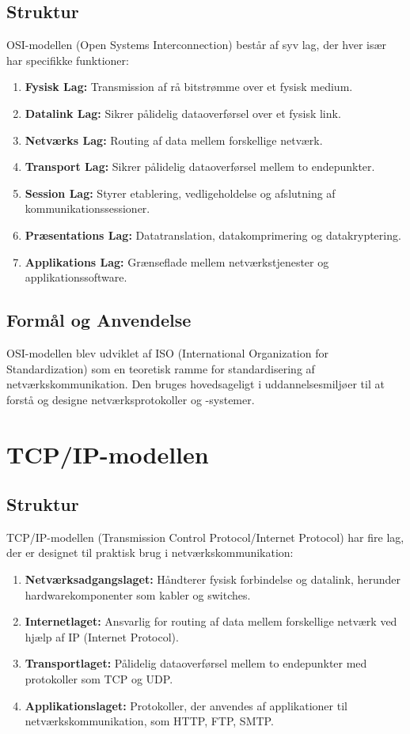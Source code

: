 \subsection{Struktur}
OSI-modellen (Open Systems Interconnection) består af syv lag, der hver især har specifikke funktioner:
\begin{enumerate}
	\item \textbf{Fysisk Lag:} Transmission af rå bitstrømme over et fysisk medium.
	\item \textbf{Datalink Lag:} Sikrer pålidelig dataoverførsel over et fysisk link.
	\item \textbf{Netværks Lag:} Routing af data mellem forskellige netværk.
	\item \textbf{Transport Lag:} Sikrer pålidelig dataoverførsel mellem to endepunkter.
	\item \textbf{Session Lag:} Styrer etablering, vedligeholdelse og afslutning af kommunikationssessioner.
	\item \textbf{Præsentations Lag:} Datatranslation, datakomprimering og datakryptering.
	\item \textbf{Applikations Lag:} Grænseflade mellem netværkstjenester og applikationssoftware.
\end{enumerate}

\subsection{Formål og Anvendelse}
OSI-modellen blev udviklet af ISO (International Organization for Standardization) som en teoretisk ramme for standardisering af netværkskommunikation. Den bruges hovedsageligt i uddannelsesmiljøer til at forstå og designe netværksprotokoller og -systemer.

\section{TCP/IP-modellen}
\subsection{Struktur}
TCP/IP-modellen (Transmission Control Protocol/Internet Protocol) har fire lag, der er designet til praktisk brug i netværkskommunikation:
\begin{enumerate}
	\item \textbf{Netværksadgangslaget:} Håndterer fysisk forbindelse og datalink, herunder hardwarekomponenter som kabler og switches.
	\item \textbf{Internetlaget:} Ansvarlig for routing af data mellem forskellige netværk ved hjælp af IP (Internet Protocol).
	\item \textbf{Transportlaget:} Pålidelig dataoverførsel mellem to endepunkter med protokoller som TCP og UDP.
	\item \textbf{Applikationslaget:} Protokoller, der anvendes af applikationer til netværkskommunikation, som HTTP, FTP, SMTP.
\end{enumerate}

